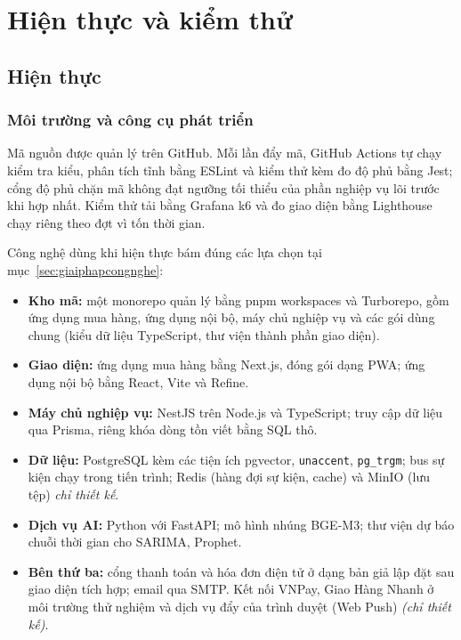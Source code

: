 \chapter{Hiện thực và kiểm thử}
\label{chap:hienthuc}


\section{Hiện thực}
\label{sec:hienthuc}


\subsection{Môi trường và công cụ phát triển}
\label{sec:moitruong}
Mã nguồn được quản lý trên GitHub. Mỗi lần đẩy mã, GitHub Actions tự chạy kiểm tra kiểu, phân tích tĩnh bằng ESLint và kiểm thử kèm đo độ phủ bằng Jest; cổng độ phủ chặn mã không đạt ngưỡng tối thiểu của phần nghiệp vụ lõi trước khi hợp nhất. Kiểm thử tải bằng Grafana k6 và đo giao diện bằng Lighthouse chạy riêng theo đợt vì tốn thời gian.

Công nghệ dùng khi hiện thực bám đúng các lựa chọn tại mục~\ref{sec:giaiphapcongnghe}:
\begin{itemize}
    \item \textbf{Kho mã:} một monorepo quản lý bằng pnpm workspaces và Turborepo, gồm ứng dụng mua hàng, ứng dụng nội bộ, máy chủ nghiệp vụ và các gói dùng chung (kiểu dữ liệu TypeScript, thư viện thành phần giao diện).
    \item \textbf{Giao diện:} ứng dụng mua hàng bằng Next.js, đóng gói dạng PWA; ứng dụng nội bộ bằng React, Vite và Refine.
    \item \textbf{Máy chủ nghiệp vụ:} NestJS trên Node.js và TypeScript; truy cập dữ liệu qua Prisma, riêng khóa dòng tồn viết bằng SQL thô.
    \item \textbf{Dữ liệu:} PostgreSQL kèm các tiện ích pgvector, \texttt{unaccent}, \texttt{pg\_trgm}; bus sự kiện chạy trong tiến trình; Redis (hàng đợi sự kiện, cache) và MinIO (lưu tệp) \emph{chỉ thiết kế}.
    \item \textbf{Dịch vụ AI:} Python với FastAPI; mô hình nhúng BGE-M3; thư viện dự báo chuỗi thời gian cho SARIMA, Prophet.
    \item \textbf{Bên thứ ba:} cổng thanh toán và hóa đơn điện tử ở dạng bản giả lập đặt sau giao diện tích hợp; email qua SMTP. Kết nối VNPay, Giao Hàng Nhanh ở môi trường thử nghiệm và dịch vụ đẩy của trình duyệt (Web Push) \emph{(chỉ thiết kế)}.
\end{itemize}

